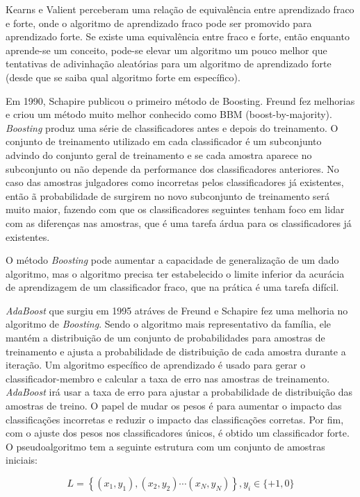 Kearns e Valient perceberam uma relação de equivalência entre aprendizado fraco e forte, onde o algoritmo de aprendizado fraco pode ser promovido para aprendizado forte.
Se existe uma equivalência entre fraco e forte, então enquanto aprende-se um conceito, pode-se elevar um algoritmo um pouco melhor que tentativas de adivinhação aleatórias para um algoritmo de aprendizado forte (desde que se saiba qual algoritmo forte em específico).

Em 1990, Schapire publicou o primeiro método de Boosting. Freund fez melhorias e criou um método muito melhor conhecido como BBM (boost-by-majority).
\textit{Boosting} produz uma série de classificadores antes e depois do treinamento. O conjunto de treinamento utilizado em cada classificador é um subconjunto advindo do conjunto geral de treinamento e se cada amostra aparece no subconjunto ou não depende da performance dos classificadores anteriores. No caso das amostras julgadores como incorretas pelos classificadores já existentes, então ã probabilidade de surgirem no novo subconjunto de treinamento será muito maior, fazendo com que os classificadores seguintes tenham foco em lidar com as diferenças nas amostras, que é uma tarefa árdua para os classificadores já existentes.

O método \textit{Boosting} pode aumentar a capacidade de generalização de um dado algoritmo, mas o algoritmo precisa ter estabelecido o limite inferior da acurácia de aprendizagem de um classificador fraco, que na prática é uma tarefa difícil.

\textit{AdaBoost} que surgiu em 1995 atráves de Freund e Schapire fez uma melhoria no algoritmo de \textit{Boosting}.
Sendo o algoritmo mais representativo da família, ele mantém a distribuição de um conjunto de probabilidades para amostras de treinamento e ajusta a probabilidade de distribuição de cada amostra durante a iteração. Um algoritmo específico de aprendizado é usado para gerar o classificador-membro e calcular a taxa de erro nas amostras de treinamento. \textit{AdaBoost} irá usar a taxa de erro para ajustar a probabilidade de distribuição das amostras de treino. O papel de mudar os pesos é para aumentar o impacto das classificações incorretas e reduzir o impacto das classificações corretas. Por fim, com o ajuste dos pesos nos classificadores únicos, é obtido um classificador forte.
O pseudoalgoritmo tem a seguinte estrutura com um conjunto de amostras iniciais:

\begin{equation}
    L=\left\{\left(x_{1}, y_{1}\right),\left(x_{2}, y_{2}\right) \cdots\left(x_{N}, y_{N}\right)\right\}, y_{i} \in\{+1,0\}
\end{equation}

